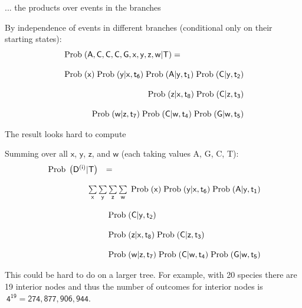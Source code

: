 \documentclass[bluish,slideColor,colorBG,pdf]{prosper}
\def\prob{{\rm \;Prob\;}}
\begin{document}
\begin{slide}[Replace]{ ... the products over events in the branches}

By independence of events in different branches (conditional only on their
starting states):
\[
\begin{array}{l c}
\multicolumn{2}{l}{\mathsf{\prob(A, C, C, C, G, x, y, z, w | T)  = }} \\
 & \\
 \multicolumn{2}{r}{\mathsf{\prob(x) \prob(y|x,t_6) \prob(A|y, t_1) \prob(C|y, t_2)}}\\
& \\
 \multicolumn{2}{r}{\mathsf{\prob(z|x, t_8) \prob(C|z, t_3)}}\\
& \\
 \multicolumn{2}{r}{\mathsf{\prob(w|z, t_7) \prob(C|w, t_4) \prob(G|w, t_5)}}
\end{array}
\]

\end{slide}

\begin{slide}[Replace]{The result looks hard to compute}

Summing over all $\mathsf{x}$, $\mathsf{y}$, $\mathsf{z}$, and $\mathsf{w}$ (each taking values A, G, C, T):
\[
\begin{array}{c l}
\mathsf{\prob\left(D^{(i)}|T\right)} & \mathsf{=} \\
& \\
\multicolumn{2}{r}{\mathsf{\sum\limits_x \sum\limits_y \sum\limits_z \sum\limits_w
\prob(x) \prob(y|x,t_6) \prob(A|y, t_1)}}\\
& \\
& \mathsf{\prob(C|y, t_2)}\\
&  \\ 
& \mathsf{\prob(z|x, t_8) \prob(C|z, t_3)}\\
& \\
& \mathsf{\prob(w|z, t_7) \prob(C|w, t_4) \prob(G|w, t_5)}
\end{array}
\]
\bigskip

This could be hard to do on a larger tree.  For example, with 20 species
there are 19 interior nodes and thus the number of outcomes for interior
nodes is $\ \mathsf{4^{19} = 274,877,906,944}$.

\end{slide}
\end{document}
